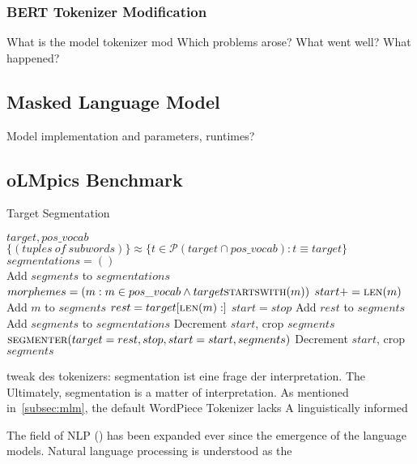 \subsubsection{BERT Tokenizer Modification}
\label{subsubsec:tokenizer-modification}
What is the model tokenizer mod
Which problems arose? What went well? What happened?



\subsection{Masked Language Model}
\label{subsec:masked-language-model}
Model implementation and parameters, runtimes?

\subsection{oLMpics Benchmark}
\label{subsec:olmpics-benchmark}

\begin{algorithm}
    \caption{Target Segmentation}\label{alg:segmenter}
    \begin{algorithmic}[2]
        \Require $target,pos\_vocab$ 
        \Ensure $\{(tuples\:of\:subwords)\} \approx \{ t \in \mathcal{P} (target \cap pos\_vocab) : t \equiv target\}$
        \\
        \State $segmentations = ()$
        \\

            \State Add $segments$ to $segmentations$
        \Else
            \State $morphemes = (m : m \in pos\_vocab \wedge target \textsc{startswith}(m))$
                \State $start += \textsc{len}(m)$
                \State Add $m$ to $segments$
                \State $rest = target[\textsc{len}(m):]$
                    \State $start = stop$
                    \State Add $rest$ to $segments$
                    \State Add $segments$ to $segmentations$
                    \State Decrement $start$, crop $segments$
                \Else
                    \State $\textsc{segmenter}(target=rest, stop, start=start, segments)$
                    \State Decrement $start$, crop $segments$
                \EndIf
            \EndFor
        \EndIf
        \EndFunction
    \end{algorithmic}
\end{algorithm}


tweak des tokenizers: segmentation ist eine frage der interpretation.
The
Ultimately, segmentation is a matter of interpretation.
As mentioned in~\ref{subsec:mlm}, the default WordPiece Tokenizer lacks
A linguistically informed



The field of NLP  (\cite{METZLER2016}) has been expanded ever since the emergence of the language models.
Natural language processing is understood as the